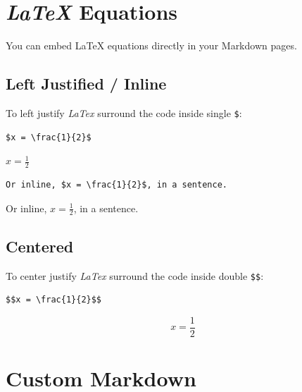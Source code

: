 \documentclass[
  12pt,
  openany]{book}
\begin{document}
\section{\texorpdfstring{\emph{LaTeX}
Equations}{LaTeX Equations}}\label{latex-equations}

You can embed LaTeX equations directly in your Markdown pages.

\subsection{Left Justified / Inline}\label{left-justified-inline}

To left justify \emph{LaTex} surround the code inside single
\texttt{\$}:

\begin{codebox}
\begin{verbatim}
$x = \frac{1}{2}$
\end{verbatim}

\end{codebox}

\(x = \frac{1}{2}\)

\begin{codebox}[Inline]
\begin{verbatim}
Or inline, $x = \frac{1}{2}$, in a sentence.
\end{verbatim}

\end{codebox}

Or inline, \(x = \frac{1}{2}\), in a sentence.

\subsection{Centered}\label{centered}

To center justify \emph{LaTex} surround the code inside double
\texttt{\$\$}:

\begin{codebox}
\begin{verbatim}
$$x = \frac{1}{2}$$
\end{verbatim}

\end{codebox}

\[x = \frac{1}{2}\]

\section{Custom Markdown}\label{custom-markdown}
\end{document}
